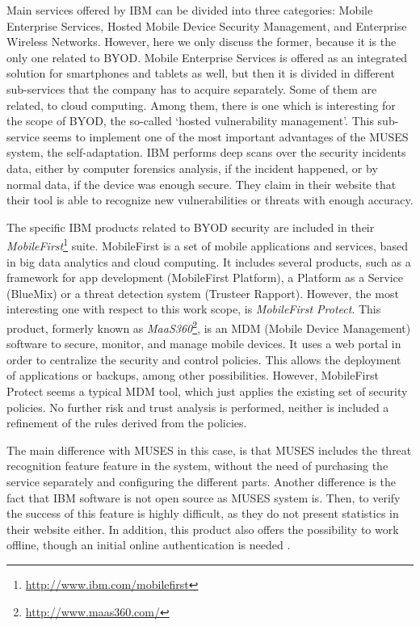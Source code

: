 Main services offered by IBM can be divided into three categories: Mobile Enterprise Services, Hosted Mobile Device Security Management, and Enterprise Wireless Networks. However, here we only discuss the former, because it is the only one related to BYOD. Mobile Enterprise Services is offered as an integrated solution for smartphones and tablets as well, but then it is divided in different sub-services that the company has to acquire separately. Some of them are related, to cloud computing. Among them, there is one which is interesting for the scope of BYOD, the so-called `hosted vulnerability management'. This sub-service seems to implement one of the most important advantages of the MUSES system, the self-adaptation. IBM performs deep scans over the security incidents data, either by computer forensics analysis, if the incident happened, or by normal data, if the device was enough secure. They claim in their website \cite{ibmVulnMgm} that their tool is able to recognize new vulnerabilities or threats with enough accuracy. 

The specific IBM products related to BYOD security are included in their {\em MobileFirst}\footnote{\url{http://www.ibm.com/mobilefirst}} suite. MobileFirst is a set of mobile applications and services, based in big data analytics and cloud computing. It includes several products, such as a framework for app development (MobileFirst Platform), a Platform as a Service (BlueMix) or a threat detection system (Trusteer Rapport). However, the most interesting one with respect to this work scope, is {\em MobileFirst Protect}. This product, formerly known as {\em MaaS360}\footnote{\url{http://www.maas360.com/}}, is an MDM (Mobile Device Management) software to secure, monitor, and manage mobile devices. It uses a web portal in order to centralize the security and control policies. This allows the deployment of applications or backups, among other possibilities. However, MobileFirst Protect seems a typical MDM tool, which just applies the existing set of security policies. No further risk and trust analysis is performed, neither is included a refinement of the rules derived from the policies.

The main difference with MUSES in this case, is that MUSES includes the threat recognition feature feature in the system, without the need of purchasing the service separately and configuring the different parts. Another difference is the fact that IBM software is not open source as MUSES system is. Then, to verify the success of this feature is highly difficult, as they do not present statistics in their website either. In addition, this product also offers the possibility to work offline, though an initial online authentication is needed \cite{mobFirstAuth}. 
 
